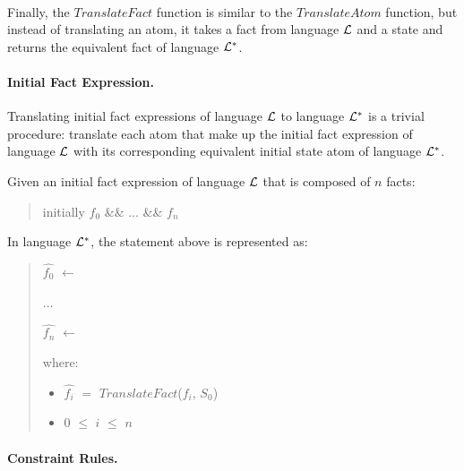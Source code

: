 \documentclass[10pt, twocolumn]{article}
\begin{document}
        \paragraph{}

          Finally, the $TranslateFact$ function is similar to the
          $TranslateAtom$ function, but instead of translating an atom, it
          takes a fact from language ${\cal L}$ and a state and returns the
          equivalent fact of language ${\cal L}^{*}$.

        \paragraph{Initial Fact Expression.}

          Translating initial fact expressions of language ${\cal L}$ to
          language ${\cal L}^{*}$ is a trivial procedure: translate each atom
          that make up the initial fact expression of language ${\cal L}$
          with its corresponding equivalent initial state atom of language
          ${\cal L}^{*}$. 

          Given an initial fact expression of language ${\cal L}$ that is
          composed of $n$ facts:

          \begin{quote}
            initially $f_{0}$ \&\& ... \&\& $f_{n}$
          \end{quote}

          In language ${\cal L}^{*}$, the statement above is represented as:

          \begin{quote}
            $\hat{f_{0}}$ $\leftarrow$

            ...

            $\hat{f_{n}}$ $\leftarrow$

            where:
              \begin{itemize}
                \item
                  $\hat{f_{i}}$ $=$ $TranslateFact$($f_{i}$, $S_{0}$)
                \item
                  $0$ $\leq$ $i$ $\leq$ $n$
              \end{itemize}
          \end{quote}

        \paragraph{Constraint Rules.}
\end{document}
